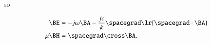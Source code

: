 so

\begin{dmath}\label{eqn:potentialSection_electric:2320}
\begin{aligned}
\BE &= -j \omega \BA -\frac{j c}{k} \spacegrad \lr{ \spacegrad \cdot \BA } \\
\mu \BH &= \spacegrad \cross \BA.
\end{aligned}
\end{dmath}

